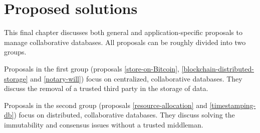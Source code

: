 \chapter{Proposed solutions}

\iffalse
- general introduction of the several propsed methods, maybe putting them in two categories
\fi

This final chapter discusses both general and application-specific proposals to manage collaborative databases. All proposals can be roughly divided into two groups. 

Proposals in the first group (proposals \ref{store-on-Bitcoin}, \ref{blockchain-distributed-storage} and \ref{notary-will}) focus on centralized, collaborative databases. They discuss the removal of a trusted third party in the storage of data.

Proposals in the second group (proposals \ref{resource-allocation} and \ref{timestamping-db}) focus on distributed, collaborative databases. They discuss solving the immutability and consensus issues without a trusted middleman. 


\newpage

\newpage

\newpage

\newpage

\newpage

\iffalse
other examples to discuss:

- resource allocation system based on namecoin
\fi